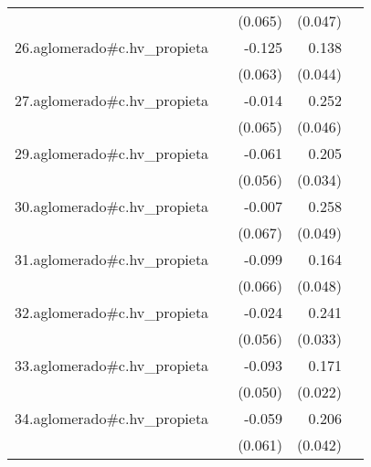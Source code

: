 {\begin{longtable}{l*{4}{D{.}{.}{-1}}}
            &                     &     (0.065)         &     (0.047)         &                     \\
\addlinespace
26.aglomerado#c.hv\_propieta&                     &      -0.125\sym{*}  &       0.138\sym{**} &                     \\
            &                     &     (0.063)         &     (0.044)         &                     \\
\addlinespace
27.aglomerado#c.hv\_propieta&                     &      -0.014         &       0.252\sym{***}&                     \\
            &                     &     (0.065)         &     (0.046)         &                     \\
\addlinespace
29.aglomerado#c.hv\_propieta&                     &      -0.061         &       0.205\sym{***}&                     \\
            &                     &     (0.056)         &     (0.034)         &                     \\
\addlinespace
30.aglomerado#c.hv\_propieta&                     &      -0.007         &       0.258\sym{***}&                     \\
            &                     &     (0.067)         &     (0.049)         &                     \\
\addlinespace
31.aglomerado#c.hv\_propieta&                     &      -0.099         &       0.164\sym{***}&                     \\
            &                     &     (0.066)         &     (0.048)         &                     \\
\addlinespace
32.aglomerado#c.hv\_propieta&                     &      -0.024         &       0.241\sym{***}&                     \\
            &                     &     (0.056)         &     (0.033)         &                     \\
\addlinespace
33.aglomerado#c.hv\_propieta&                     &      -0.093         &       0.171\sym{***}&                     \\
            &                     &     (0.050)         &     (0.022)         &                     \\
\addlinespace
34.aglomerado#c.hv\_propieta&                     &      -0.059         &       0.206\sym{***}&                     \\
            &                     &     (0.061)         &     (0.042)         &                     \\

\end{longtable}}
